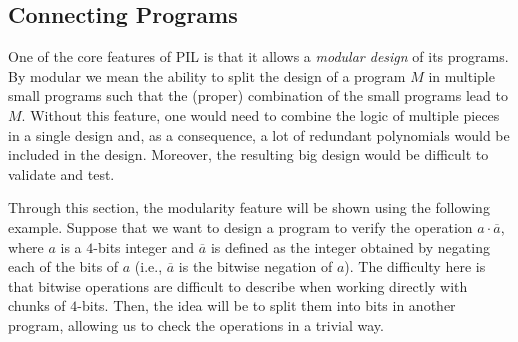 



\subsection{Connecting Programs} \label{sec:connecting-sm}

One of the core features of PIL is that it allows a \textit{modular design} of its programs. By modular we mean the ability to split the design of a program $M$ in multiple small programs such that the (proper) combination of the small programs lead to $M$. 
Without this feature, one would need to combine the logic of multiple pieces in a single design and, as a consequence, a lot of redundant polynomials would be included in the design. Moreover, the resulting big design would be difficult to validate and test. 

Through this section, the modularity feature will be shown using the following example. Suppose that we want to design a program to verify the operation $a \cdot \overline{a}$, where $a$ is a $4$-bits integer and $\overline{a}$ is defined as the integer obtained by negating each of the bits of $a$ (i.e., $\overline{a}$ is the bitwise negation of $a$). The difficulty here is that bitwise operations are difficult to describe when working directly with chunks of $4$-bits. Then, the idea will be to split them into bits in another program, allowing us to check the operations in a trivial way. 

